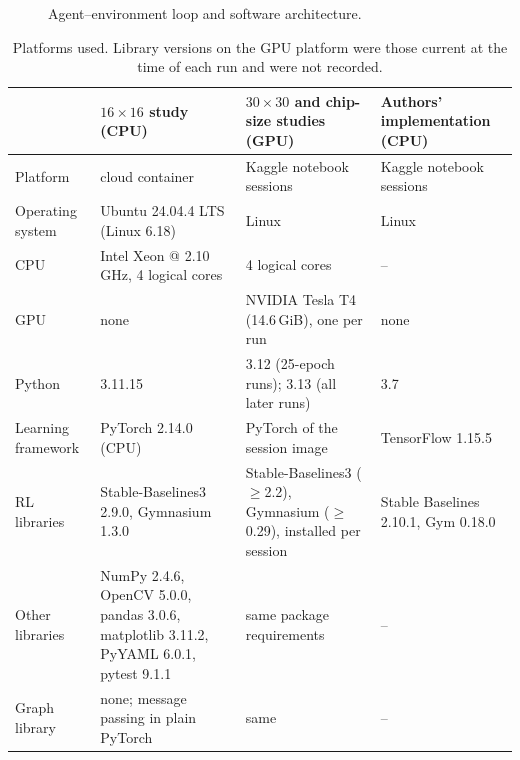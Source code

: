 \documentclass[11pt,a4paper]{article}
\begin{document}
\begin{figure}[H]
\centering
{}
\caption{Agent--environment loop and software architecture.}
\label{fig:loop}
\end{figure}

\begin{table}[H]
\centering\small
\begin{tabularx}{\textwidth}{lLLL}
\toprule
& $16\times16$ study (CPU) & $30\times30$ and chip-size studies (GPU) & Authors' implementation (CPU) \\ \midrule
Platform & cloud container & Kaggle notebook sessions & Kaggle notebook sessions \\
Operating system & Ubuntu 24.04.4 LTS (Linux 6.18) & Linux & Linux \\
CPU & Intel Xeon @ 2.10\,GHz, 4 logical cores & 4 logical cores & -- \\
GPU & none & NVIDIA Tesla T4 (14.6\,GiB), one per run & none \\
Python & 3.11.15 & 3.12 (25-epoch runs); 3.13 (all later runs) & 3.7 \\
Learning framework & PyTorch 2.14.0 (CPU) & PyTorch of the session image & TensorFlow 1.15.5 \\
RL libraries & Stable-Baselines3 2.9.0, Gymnasium 1.3.0 & Stable-Baselines3 ($\geq$2.2), Gymnasium ($\geq$0.29), installed per session & Stable Baselines 2.10.1, Gym 0.18.0 \\
Other libraries & NumPy 2.4.6, OpenCV 5.0.0, pandas 3.0.6, matplotlib 3.11.2, PyYAML 6.0.1, pytest 9.1.1 & same package requirements & -- \\
Graph library & none; message passing in plain PyTorch & same & -- \\
\bottomrule
\end{tabularx}
\caption{Platforms used. Library versions on the GPU platform were those
  current at the time of each run and were not recorded.}
\label{tab:platform}
\end{table}
\end{document}
